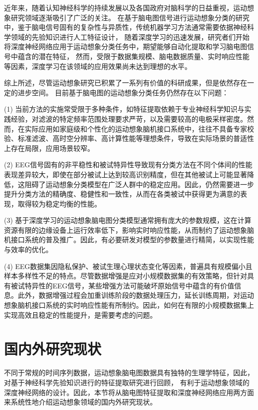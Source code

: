 近年来，随着认知神经科学的持续发展以及各国政府对脑科学的日益重视，运动想象研究领域逐渐吸引了广泛的关注。
在基于脑电图信号进行运动想象分类的研究中，鉴于脑电信号固有的复杂性与异质性，传统机器学习方法通常需要依据神经科学领域的先验知识进行人工特征设计，
随着深度学习的迅速发展，研究者们开始将深度神经网络应用于运动想象分类任务中，期望能够自动化提取和学习脑电图信号中蕴含的潜在特征，
然而，受限于数据集规模、脑电数据质量、实时响应性能等因素，深度学习在该领域的应用效果尚未达到理想的水平。

综上所述，尽管运动想象研究已积累了一系列有价值的科研成果，但是依然存在一定的进步空间。
目前基于脑电图的运动想象分类任务仍然存在以下问题：

(1) 当前方法的实施常受限于多种条件，如特征提取依赖于专业神经科学知识与实践经验，对滤波的特定频率范围处理要求严苛，以及需要较高的电极采样密度。然而，在实际应用如家庭级和个性化的运动想象脑机接口系统中，往往不具备专家校验、标准滤波、高时空分辨率、高计算性能等理想条件，导致在实际场景的普适性上存在局限，应用场景较窄。

(2) EEG信号固有的非平稳性和被试特异性导致现有分类方法在不同个体间的性能表现差异较大，即使在部分被试上达到较高识别精度，但在其他被试上可能显著降低，这阻碍了运动想象分类模型在广泛人群中的稳定应用。因此，仍然需要进一步提升分类方法的精确度、稳健性和一致性，从而在各类被试中获得更为满意的表现，取得较为稳定均衡的性能。

(3) 基于深度学习的运动想象脑电图分类模型通常拥有庞大的参数规模，这在计算资源有限的边缘设备上运行效率低下，影响实时响应性能，从而制约了运动想象脑机接口系统的普及推广。因此，有必要研发对模型的参数量进行精简，以实现性能与效率的优化。

(4) EEG数据集因隐私保护、被试生理心理状态变化等因素，普遍具有规模偏小且样本多样性不足的特点。尽管数据增强是应对小规模数据集的有效策略，但针对具有被试特异性的EEG信号，某些增强方法可能破坏原始信号中蕴含的有价值信息。此外，数据增强过程会加重训练阶段的数据处理压力，延长训练周期，对运动想象脑机接口系统的实时响应性能有所制约。因此，如何在有限的小规模数据集上实现高效且稳定的性能提升，是需要考虑的问题。

\section{国内外研究现状}

不同于常规的时间序列数据，运动想象脑电图数据具有独特的生理学特征，因此，对基于神经科学先验知识进行的特征提取研究进行回顾，
有利于运动想象领域的深度神经网络的设计。因此，本节将从脑电图特征提取和深度神经网络应用两方面来系统性地介绍运动想象领域的国内外研究现状。

